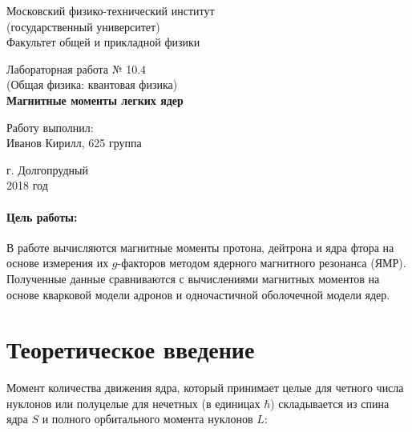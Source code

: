 \documentclass[12pt]{kiarticle} %
\begin{document}
	
	\begin{titlepage}
		\begin{center}
			\large 	Московский физико-технический институт \\
			(государственный университет) \\
			Факультет общей и прикладной физики \\
			\vspace{0.2cm}
			
			\vspace{4.5cm}
			Лабораторная работа № 10.4 \\ \vspace{0.2cm}
			\large (Общая физика: квантовая физика) \\ \vspace{0.2cm}
			\LARGE \textbf{ Магнитные моменты легких ядер }
		\end{center}
		\vspace{2.3cm} \large
		
		\begin{center}
			Работу выполнил: \\
			Иванов Кирилл,
			625 группа
			\vspace{10mm}		
			
		\end{center}
		
		\begin{center} \vspace{60mm}
			г. Долгопрудный \\
			2018 год
		\end{center}
	\end{titlepage}


	\paragraph*{Цель работы:} 
	В работе вычисляются магнитные моменты протона, дейтрона и ядра фтора на основе измерения их $ g $-факторов методом ядерного магнитного резонанса (ЯМР). Полученные данные сравниваются с вычислениями магнитных моментов на основе кварковой модели адронов и одночастичной оболочечной модели ядер.
	
	
	\section{Теоретическое введение}
	
	Момент количества движения ядра, который принимает целые для четного числа нуклонов или полуцелые для нечетных (в единицах $ \hbar $) складывается из спина ядра $ S $ и полного орбитального момента нуклонов $ L $:
	
\end{document}
